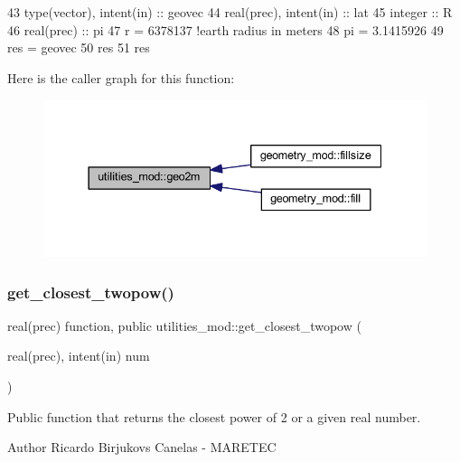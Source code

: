 \begin{DoxyCode}
43     \textcolor{keywordtype}{type}(vector), \textcolor{keywordtype}{intent(in)} :: geovec
44     \textcolor{keywordtype}{real(prec)}, \textcolor{keywordtype}{intent(in)} :: lat
45     \textcolor{keywordtype}{integer} :: R
46     \textcolor{keywordtype}{real(prec)} :: pi
47     r = 6378137 \textcolor{comment}{!earth radius in meters}
48     pi = 3.1415926
49     res = geovec
50     res%
51     res%
\end{DoxyCode}
Here is the caller graph for this function\+:
\nopagebreak
\begin{figure}[H]
\begin{center}
\leavevmode
\includegraphics[width=337pt]{namespaceutilities__mod_a415de70150d626b1e8c6e0c8c0e09e8b_icgraph}
\end{center}
\end{figure}
\mbox{\label{namespaceutilities__mod_a683f93677348e11d331c1c37c66caf7a}} 
\subsubsection{\texorpdfstring{get\+\_\+closest\+\_\+twopow()}{get\_closest\_twopow()}}
{\footnotesize\ttfamily real(prec) function, public utilities\+\_\+mod\+::get\+\_\+closest\+\_\+twopow (\begin{DoxyParamCaption}\item[{real(prec), intent(in)}]{num }\end{DoxyParamCaption})}



Public function that returns the closest power of 2 or a given real number. 

\begin{DoxyAuthor}{Author}
Ricardo Birjukovs Canelas -\/ M\+A\+R\+E\+T\+EC 
\end{DoxyAuthor}

